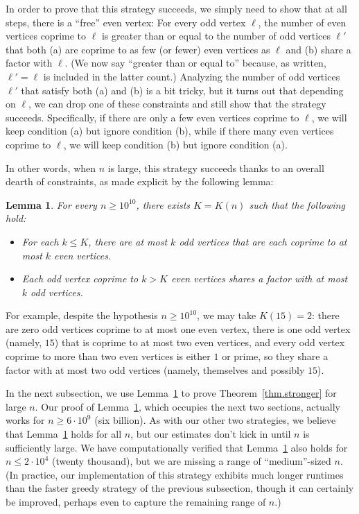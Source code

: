 \documentclass{article}
\theoremstyle{plain}
\newtheorem{lemma}[theorem]{Lemma}
\theoremstyle{definition}
\theoremstyle{remark}
\begin{document}
In order to prove that this strategy succeeds, we simply need to show that at all steps, there is a ``free'' even vertex:
For every odd vertex $\ell$, the number of even vertices coprime to $\ell$ is greater than or equal to the number of odd vertices $\ell'$ that both (a) are coprime to as few (or fewer) even vertices as $\ell$ and (b) share a factor with $\ell$.
(We now say ``greater than or equal to'' because, as written, $\ell'=\ell$ is included in the latter count.)
Analyzing the number of odd vertices $\ell'$ that satisfy both (a) and (b) is a bit tricky, but it turns out that depending on $\ell$, we can drop one of these constraints and still show that the strategy succeeds.
Specifically, if there are only a few even vertices coprime to $\ell$, we will keep condition (a) but ignore condition (b), while if there many even vertices coprime to $\ell$, we will keep condition (b) but ignore condition (a).

In other words, when $n$ is large, this strategy succeeds thanks to an overall dearth of constraints, as made explicit by the following lemma:

\begin{lemma}
\label{lem.main}
For every $n\geq10^{10}$, there exists $K=K(n)$ such that the following hold:
\begin{itemize}
\item[(a)]
For each $k\leq K$, there are at most $k$ odd vertices that are each coprime to at most $k$ even vertices.
\item[(b)]
Each odd vertex coprime to $k>K$ even vertices shares a factor with at most $k$ odd vertices.
\end{itemize}
\end{lemma}

For example, despite the hypothesis $n\geq10^{10}$, we may take $K(15)=2$: there are zero odd vertices coprime to at most one even vertex, there is one odd vertex (namely, $15$) that is coprime to at most two even vertices, and every odd vertex coprime to more than two even vertices is either $1$ or prime, so they share a factor with at most two odd vertices (namely, themselves and possibly $15$).

In the next subsection, we use Lemma~\ref{lem.main} to prove Theorem~\ref{thm.stronger} for large $n$.
Our proof of Lemma~\ref{lem.main}, which occupies the next two sections, actually works for $n\geq 6\cdot 10^9$ (six billion).
As with our other two strategies, we believe that Lemma~\ref{lem.main} holds for all $n$, but our estimates don't kick in until $n$ is sufficiently large.
We have computationally verified that Lemma~\ref{lem.main} also holds for $n\leq2\cdot 10^4$ (twenty thousand), but we are missing a range of ``medium''-sized $n$.
(In practice, our implementation of this strategy exhibits much longer runtimes than the faster greedy strategy of the previous subsection, though it can certainly be improved, perhaps even to capture the remaining range of $n$.)
\end{document}
